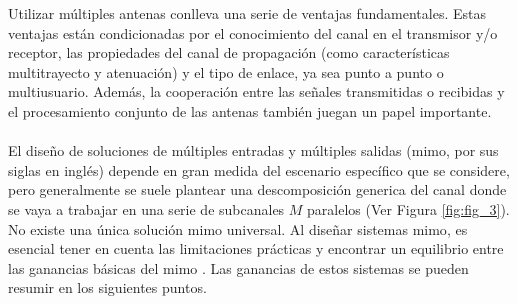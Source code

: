 Utilizar múltiples antenas conlleva una serie de ventajas fundamentales. Estas ventajas están condicionadas por el conocimiento del canal en el transmisor y/o receptor, las propiedades del canal de propagación (como características multitrayecto y atenuación) y el tipo de enlace, ya sea punto a punto o multiusuario. Además, la cooperación entre las señales transmitidas o recibidas y el procesamiento conjunto de las antenas también juegan un papel importante.\\
\\
El diseño de soluciones de múltiples entradas y múltiples salidas (\gls{mimo}, por sus siglas en inglés) depende en gran medida del escenario específico que se considere, pero generalmente se suele plantear una descomposición generica del canal donde se vaya a trabajar en una serie de subcanales $M$ paralelos (Ver Figura \ref{fig:fig_3}). No existe una única solución \gls{mimo} universal. Al diseñar sistemas \gls{mimo}, es esencial tener en cuenta las limitaciones prácticas y encontrar un equilibrio entre las ganancias básicas del \gls{mimo} \cite{ordonez2011fundamental}. Las ganancias de estos sistemas se pueden resumir en los siguientes puntos.

